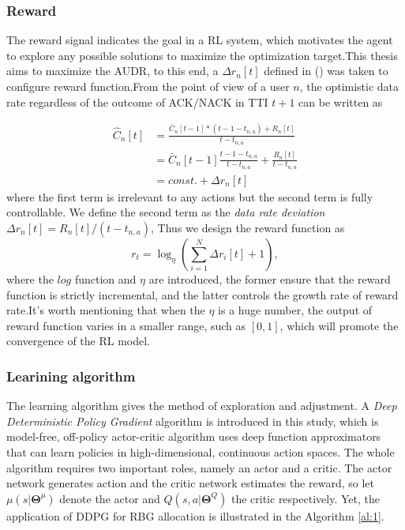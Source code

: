 \documentclass[conference,compsocconf]{IEEEtran}
\begin{document}
\subsubsection{Reward}
The reward signal indicates the goal in a RL system, which motivates the agent to explore any possible solutions to maximize the optimization target.This thesis aims to maximize the AUDR, to this end, a $ \Delta r_n[t] $ defined in () was taken to configure reward function.From the point of view of a user $n$, the optimistic data rate regardless of the outcome of ACK/NACK in TTI $t+1$ can be written as

\begin{equation}
\begin{aligned}
\hat{C}_n[t]&=\frac{\bar{C}_n[t-1]*(t-1-t_{n,a})+R_n[t]}{t-t_{n,a}} \\
&= \bar{C}_n[t-1]\frac{t-1-t_{n,a}}{t-t_{n,a}}+\frac{R_n[t]}{t-t_{n,a}} \\
&= const.+\Delta r_n[t]
\end{aligned}
\end{equation}
where the first term is irrelevant to any actions but the second term is fully controllable. We define the second term as the \textit{data rate deviation} $\Delta r_n[t]=R_n[t]/(t-t_{n,a})$, Thus we design the reward function as
\begin{equation}
r_t = \log_{\eta} \left(\sum_{i=1}^{N}\Delta r_i[t]+1\right),
\end{equation}
where the $log$ function and $\eta$ are introduced, the former ensure that the reward function is strictly incremental, and the latter controls the growth rate of reward rate.It's worth mentioning that when the $\eta$ is a huge number, the output of reward function varies in a smaller range, such as $ [0, 1] $, which will promote the convergence of the RL model.

\subsubsection{Learining algorithm}
The learning algorithm gives the method of exploration and adjustment. A \textit{Deep Deterministic Policy Gradient} algorithm  is introduced in this study, which is model-free, off-policy actor-critic algorithm uses deep function approximators that can learn policies in high-dimensional, continuous action spaces\cite{Lillicrap2015Continuous}. The whole algorithm requires two important roles, namely an actor and a critic. The actor network generates action and the critic network estimates the reward, so let $ \mu (s|\mathbf{\Theta}^{\mu})$ denote the actor and $ Q (s,a|\mathbf{\Theta}^{Q})$ the critic respectively. Yet,
the application of DDPG for RBG allocation is illustrated in the Algorithm \ref{al:1}.
\end{document}
